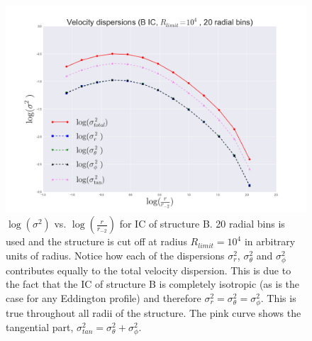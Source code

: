 \begin{figure}[!htbp]
\centering
\includegraphics[width=1.0\linewidth]{img/B_IC_sigma_r_2.png}
\caption{$\log (\sigma^2)$ vs. $\log (\frac{r}{r_{-2}})$ for IC of structure B. 20 radial bins is used and the structure is cut off at radius $R_{limit} = 10^4$ in arbitrary units of radius. Notice how each of the dispersions $\sigma_r^2$, $\sigma_{\theta}^2$ and $\sigma_{\phi}^2$ contributes equally to the total velocity dispersion. This is due to the fact that the IC of structure B is completely isotropic (as is the case for any Eddington profile) and therefore $\sigma_r^2 = \sigma_{\theta}^2 = \sigma_{\phi}^2$. This is true throughout all radii of the structure. The pink curve shows the tangential part, $\sigma_{tan}^2 = \sigma_{\theta}^2 + \sigma_{\phi}^2$.}
\label{fig:test}
\end{figure}

